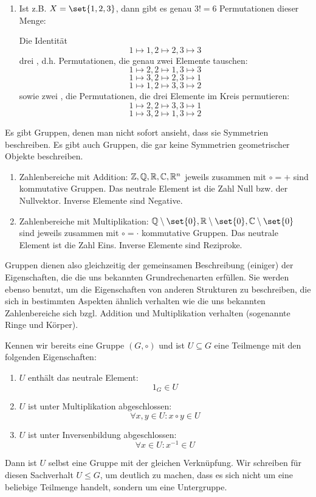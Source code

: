 \begin{example}[Symmetriegruppen]
\begin{enumerate}
\item Ist z.B. $X=\set{1,2,3}$, dann gibt es genau $3!=6$ Permutationen dieser Menge:

Die Identität
\[1\mapsto 1, 2\mapsto 2, 3\mapsto 3\]
drei , d.h. Permutationen, die genau zwei Elemente tauschen:
\[1\mapsto 2, 2\mapsto 1, 3\mapsto 3\]
\[1\mapsto 3, 2\mapsto 2, 3\mapsto 1\]
\[1\mapsto 1, 2\mapsto 3, 3\mapsto 2\]
sowie zwei , die Permutationen, die drei Elemente im Kreis permutieren:
\[1\mapsto 2, 2\mapsto 3, 3\mapsto 1\]
\[1\mapsto 3, 2\mapsto 1, 3\mapsto 2\]
\end{enumerate}
\end{example}

\begin{example}
Es gibt Gruppen, denen man nicht sofort ansieht, dass sie Symmetrien beschreiben. Es gibt auch Gruppen, die gar keine Symmetrien geometrischer Objekte beschreiben.

\begin{enumerate}
\item Zahlenbereiche mit Addition: $\mathbb{Z},\mathbb{Q},\mathbb{R},\mathbb{C},\mathbb{R}^n$ jeweils zusammen mit $\circ=+$ sind kommutative Gruppen. Das neutrale Element ist die Zahl Null bzw. der Nullvektor. Inverse Elemente sind Negative.
\item Zahlenbereiche mit Multiplikation: $\IQ\setminus\set{0},\IR\setminus\set{0},\IC\setminus\set{0}$ sind jeweils zusammen mit $\circ=\cdot$ kommutative Gruppen. Das neutrale Element ist die Zahl Eins. Inverse Elemente sind Reziproke.
\end{enumerate}

Gruppen dienen also gleichzeitig der gemeinsamen Beschreibung (einiger) der Eigenschaften, die die uns bekannten Grundrechenarten erfüllen. Sie werden ebenso benutzt, um die Eigenschaften von anderen Strukturen zu beschreiben, die sich in bestimmten Aspekten ähnlich verhalten wie die uns bekannten Zahlenbereiche sich bzgl. Addition und Multiplikation verhalten (sogenannte Ringe und Körper).
\end{example}

\begin{definition}[Untergruppen]
Kennen wir bereits eine Gruppe $(G,\circ)$ und ist $U\subseteq G$ eine Teilmenge mit den folgenden Eigenschaften:
\begin{enumerate}[label=(UG\arabic*)]
\item $U$ enthält das neutrale Element:
\[1_G\in U\]
\item $U$ ist unter Multiplikation abgeschlossen:
\[\forall x,y\in U: x\circ y\in U\]
\item $U$ ist unter Inversenbildung abgeschlossen:
\[\forall x\in U: x^{-1}\in U\]
\end{enumerate}
Dann ist $U$ selbst eine Gruppe mit der gleichen Verknüpfung. Wir schreiben für diesen Sachverhalt $U\leq G$, um deutlich zu machen, dass es sich nicht um eine beliebige Teilmenge handelt, sondern um eine Untergruppe.
\end{definition}

